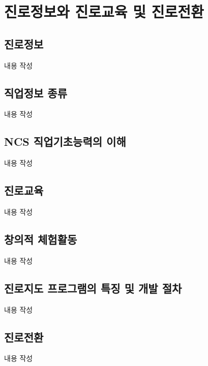 \section{진로정보와 진로교육 및 진로전환}

\subsection{진로정보}
내용 작성

\subsection{직업정보 종류}
내용 작성

\subsection{NCS 직업기초능력의 이해}
내용 작성

\subsection{진로교육}
내용 작성

\subsection{창의적 체험활동}
내용 작성

\subsection{진로지도 프로그램의 특징 및 개발 절차}
내용 작성

\subsection{진로전환}
내용 작성
